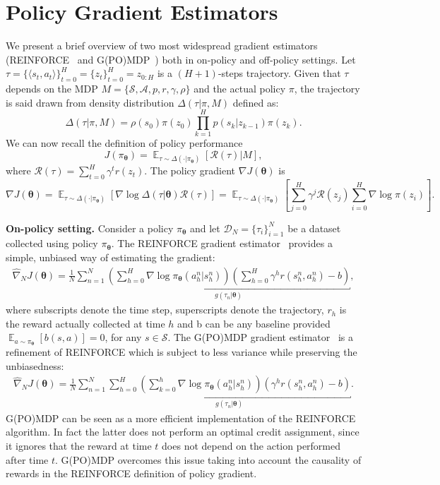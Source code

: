 \documentclass{article}
\theoremstyle{remark}
\theoremstyle{definition}
\newcommand{\todopir}[1]{\todo[color=blued, inline]{\small #1}}
\DeclareMathOperator*{\EV}{\mathbb{E}}
\newcommand{\EVV}[2][\ppvect \in \ppspace]{\EV_{#1}\left[{#2}\right]}
\newcommand{\vtheta}{\boldsymbol{\theta}}
\newcommand{\Sspace}{\mathcal{S}}
\newcommand{\Reward}{\mathcal{R}}
\newcommand{\pol}{\pi_{\vtheta}}
\newcommand{\score}[2]{\nabla\log\pi_{#1}(#2)}
\newcommand{\gradJ}[1]{\nabla J(#1)}
\newcommand{\gradApp}[2]{\widehat{\nabla}_{#2}J(#1)}
\begin{document}



\newpage
\mbox{}
\newpage
\onecolumn
\appendix

\section{Policy Gradient Estimators} \label{A:gradient_estimators}
We present a brief overview of two most widespread gradient estimators (REINFORCE~\citep{williams1992simple} and G(PO)MDP~\citep{baxter2001infinite}) both in on-policy and off-policy settings.
Let $\tau = \{\langle s_t,a_t \rangle\}_{t=0}^{H}= \{z_t\}_{t=0}^{H} = z_{0:H}$ is a $(H+1)$-steps trajectory.
Given that $\tau$ depends on the MDP $M=\{\mathcal{S},\mathcal{A}, p, r, \gamma, \rho\}$ and the actual policy $\pi$, the trajectory is
said drawn from density distribution $\Delta(\tau|\pi,M)$ defined as:
\[
        \Delta(\tau|\pi,M) = \rho(s_0) \pi(z_0) \prod_{k=1}^{H} p(s_k|z_{k-1})\pi(z_k).
\]
We can now recall the definition of policy performance 
\[
        J(\pol) = \EVV[\tau \sim \Delta(\cdot|\pol)]{\Reward(\tau)|M},
\]
where $\Reward(\tau) = \sum_{t=0}^{H}\gamma^t r(z_t)$.
The policy gradient $\nabla J(\vtheta)$ is
\begin{equation}\label{E:onpolicygradient}
        \gradJ{\vtheta} = \EVV[\tau \sim \Delta(\cdot|\pol)]{\nabla \log\Delta(\tau|\vtheta)\Reward(\tau)} = \EVV[\tau \sim \Delta(\cdot|\pol)]{\sum_{j=0}^{H} \gamma^j \mathcal{R}(z_j) \sum_{i=0}^{H} \nabla \log\pi(z_i)}.
\end{equation}

\textbf{On-policy setting.}
Consider a policy $\pol$ and let $\mathcal{D}_N = \{\tau_i\}_{i=1}^N$ be a dataset collected using policy $\pol$.
The REINFORCE gradient estimator~\citep{williams1992simple} provides a simple, unbiased way of estimating the gradient:
\begin{align*}
\gradApp{\vtheta}{N} = \frac{1}{N}\sum_{n=1}^{N}
\underbracket{
\left(\sum_{h=0}^{H}\score{\vtheta}{a_h^n\vert s_h^n}\right)\left(\sum_{h=0}^{H}\gamma^h r(s_h^n,a_h^n) - b\right)
}_{g(\tau_n|\vtheta)}
,
\end{align*}
where subscripts denote the time step, superscripts denote the trajectory, $r_h$ is the reward actually collected at time $h$ and b can be any baseline provided $\EVV[a \sim \pol]{b(s,a)} = 0$, for any $s\in\Sspace$.\todopir{check definition of baseline}
The G(PO)MDP gradient estimator~\cite{baxter2001infinite} is a refinement of REINFORCE which is subject to less variance \cite{zhao2011analysis} while preserving the unbiasedness:
\begin{align*}
\gradApp{\vtheta}{N} = \frac{1}{N}\sum_{n=1}^{N}
\underbracket{
\sum_{h=0}^{H}\left(\sum_{k=0}^{h}\score{\vtheta}{a_h^n\vert s_h^n}\right)\left(\gamma^h r(s_h^n,a_h^n) - b\right)
}_{g(\tau_n|\vtheta)}.
\end{align*}
G(PO)MDP can be seen as a more efficient implementation
of the REINFORCE algorithm. In fact the latter does not perform
an optimal credit assignment, since it ignores that the reward at time $t$ does
not depend on the action performed after time $t$. G(PO)MDP overcomes this
issue taking into account the causality of rewards in the REINFORCE definition
of policy gradient.
\end{document}
